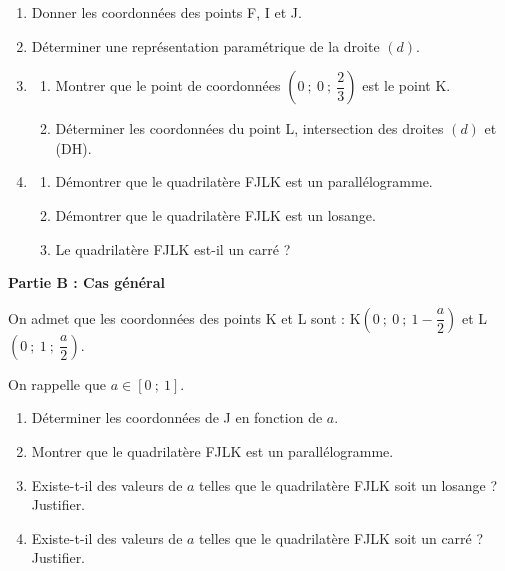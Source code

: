 \documentclass[10pt]{article}
\begin{document}
\begin{enumerate}
\item Donner les coordonnées des points F{}, I et J.
\item Déterminer une représentation paramétrique de la droite $(d)$.
\item 
	\begin{enumerate}
		\item Montrer que le point de coordonnées $\left(0~;~ 0~;~\dfrac{2}{3}\right)$ est le point K.
		\item Déterminer les coordonnées du point L, intersection des droites $(d)$ et (DH).

	\end{enumerate}
\item  
	\begin{enumerate}
		\item Démontrer que le quadrilatère FJLK est un parallélogramme. 
		\item Démontrer que le quadrilatère FJLK est un losange.
		\item Le quadrilatère FJLK est-il un carré ?

	\end{enumerate}
\end{enumerate}

\bigskip

\textbf{Partie B : Cas général}

\medskip

On admet que les coordonnées des points K et L sont : K$\left(0~;~0~;~1- \dfrac{a}{2}\right)$ et L$\left(0~;~1~;~\dfrac{a}{2}\right)$.

On rappelle que $a \in [0~;~1]$.

\medskip

\begin{enumerate}
\item Déterminer les coordonnées de J en fonction de $a$.
\item Montrer que le quadrilatère FJLK est un parallélogramme.
\item Existe-t-il des valeurs de $a$ telles que le quadrilatère FJLK soit un losange ? Justifier.
\item Existe-t-il des valeurs de $a$ telles que le quadrilatère FJLK soit un carré ? Justifier.
\end{enumerate}

\bigskip
\end{document}
